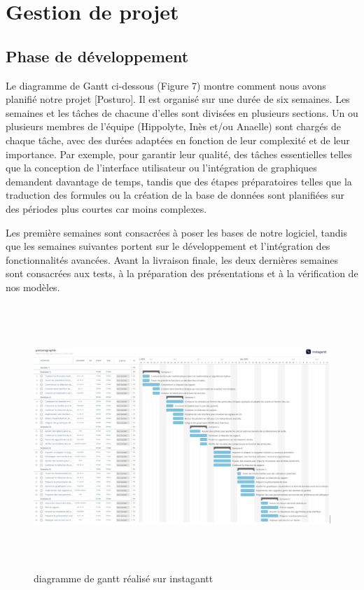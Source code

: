 \section{Gestion de projet}

\subsection{Phase de développement}

Le diagramme de Gantt ci-dessous (Figure 7) montre comment nous avons planifié 
notre projet [Posturo]. Il est organisé sur une durée de six semaines. 
Les semaines et les tâches de chacune d'elles sont divisées en plusieurs sections. 
Un ou plusieurs membres de l'équipe (Hippolyte, Inès et/ou Anaelle) sont chargés 
de chaque tâche, avec des durées adaptées en fonction de leur complexité et de 
leur importance. Par exemple, pour garantir leur qualité, des tâches essentielles 
telles que la conception de l'interface utilisateur ou l'intégration de graphiques 
demandent davantage de temps, tandis que des étapes préparatoires telles que la 
traduction des formules ou la création de la base de données sont planifiées sur 
des périodes plus courtes car moins complexes.

Les première semaines sont consacrées à poser les bases de notre logiciel, 
tandis que les semaines suivantes portent sur le développement et l'intégration 
des fonctionnalités avancées. Avant la livraison finale, les deux dernières 
semaines sont consacrées aux tests, à la préparation des présentations et à la 
vérification de nos modèles.

\begin{figure}[H]
    \centering
      \includegraphics[height=10cm]{images/Gantt.png}
      \caption{diagramme de gantt réalisé sur instagantt}\label{fig:Gantt}
\end{figure}

